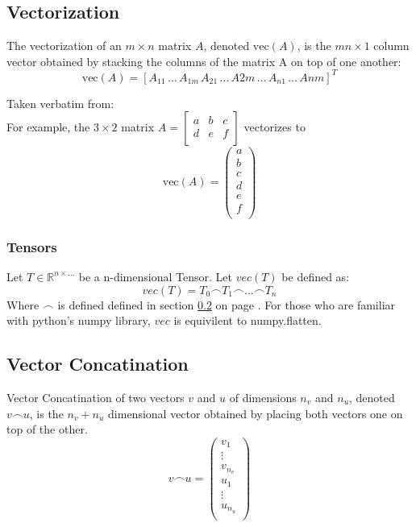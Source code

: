 \documentclass[12pt]{article}
\newcommand{\sectionref}[1]{section \ref{#1} on page \pageref{#1}}
\begin{document}
\subsection{Vectorization}  \label{sec:ref:vectorization}
The vectorization of an \(m \times n\) matrix \(A\), denoted \(\text{vec}(A)\), is the \(mn \times 1\) column vector obtained by stacking the columns of the matrix A on top of one another: 
\begin{equation}\label{eq:ref:vectorization}
\text{vec}(A) = \left[
A_{11}\,\dots\,A_{1m}\,A_{21}\,\dots \,A{2m}\,\dots\,A_{n1}\,\dots\,A{nm}
\right]^T
\end{equation}

Taken verbatim from:\cite{vectorization_2021}\\
For example, the \(3\times 2\) matrix \(A=\left[
\begin{matrix}
a & b & c\\
d & e & f\\
\end{matrix}
\right]\) vectorizes to
\[
\text{vec}(A) = \left(
\begin{matrix}
a\\
b\\
c\\
d\\
e\\
f\\
\end{matrix}
\right)
\]
\subsubsection{Tensors}\label{sec:ref:vectorization:tensor}
Let \(T \in \mathbb R^{n \times\dots}\) be a n-dimensional Tensor.
Let \(vec(T)\) be defined as:
\begin{equation}
vec(T) = T_0 \frown T_1 \frown \dots \frown T_n
\end{equation}
Where \(\frown\) is defined defined in \sectionref{sec:ref:vectorConcatination}. For those who are familiar with python's numpy library, \(vec\) is equivilent to numpy.flatten.

\subsection{Vector Concatination}\label{sec:ref:vectorConcatination}
Vector Concatination of two vectors \(v\) and \(u\) of dimensions \(n_v\) and  \(n_u\), denoted \(v\frown u\), is the \(n_v + n_u\) dimensional vector obtained by placing both vectors one on top of the other.
\begin{equation} \label{eq:ref:vecConcatination}
v\frown u = \left(
\begin{matrix}
v_1\\
\vdots\\
v_{n_v}\\
u_1\\
\vdots\\
u_{n_u}\\
\end{matrix}
\right)
\end{equation}
\end{document}
